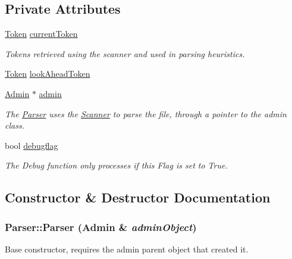 \subsection*{Private Attributes}
\begin{DoxyCompactItemize}
\item 
\hyperlink{classToken}{Token} \hyperlink{classParser_a8180cecab442c4c7f582bbe1d0682bf1}{currentToken}
\begin{DoxyCompactList}\small\item\em Tokens retrieved using the scanner and used in parsing heuristics. \item\end{DoxyCompactList}\item 
\hyperlink{classToken}{Token} \hyperlink{classParser_a4f9e59e89197efefa1feff50f5ea8725}{lookAheadToken}
\item 
\hyperlink{classAdmin}{Admin} $\ast$ \hyperlink{classParser_a96a8ee1229f37648e0ee704827b1c4c7}{admin}
\begin{DoxyCompactList}\small\item\em The \hyperlink{classParser}{Parser} uses the \hyperlink{classScanner}{Scanner} to parse the file, through a pointer to the admin class. \item\end{DoxyCompactList}\item 
bool \hyperlink{classParser_a090a56f54cfd45240a039863b8289581}{debugflag}
\begin{DoxyCompactList}\small\item\em The Debug function only processes if this Flag is set to True. \item\end{DoxyCompactList}\end{DoxyCompactItemize}


\subsection{Constructor \& Destructor Documentation}
\hypertarget{classParser_a16503336f00dfa74eedd0ad3092d2c05}{
\subsubsection[{Parser}]{\setlength{\rightskip}{0pt plus 5cm}Parser::Parser ({\bf Admin} \& {\em adminObject})}}
\label{classParser_a16503336f00dfa74eedd0ad3092d2c05}


Base constructor, requires the admin parent object that created it. 

